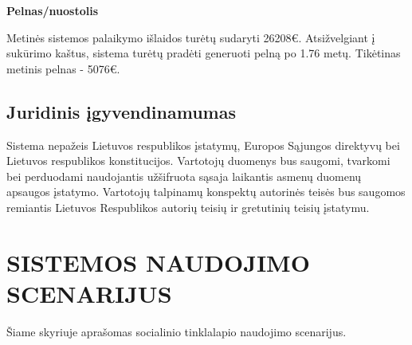 \documentclass{VUMIFPSkursinis}
\begin{document}
\textbf{Pelnas/nuostolis}

Metinės sistemos palaikymo išlaidos turėtų sudaryti 26208€. Atsižvelgiant į sukūrimo kaštus, sistema turėtų pradėti generuoti pelną po 1.76 metų. Tikėtinas metinis pelnas - 5076€.

\subsection{Juridinis įgyvendinamumas}

 Sistema nepažeis Lietuvos respublikos įstatymų, Europos Sąjungos direktyvų bei Lietuvos respublikos konstitucijos. Vartotojų duomenys bus saugomi, tvarkomi bei perduodami naudojantis užšifruota sąsaja laikantis asmenų duomenų apsaugos įstatymo. Vartotojų talpinamų konspektų autorinės teisės bus saugomos remiantis Lietuvos Respublikos autorių teisių ir gretutinių teisių įstatymu. 

\newpage

\section{SISTEMOS NAUDOJIMO SCENARIJUS}
Šiame skyriuje aprašomas socialinio tinklalapio naudojimo scenarijus.
\end{document}
